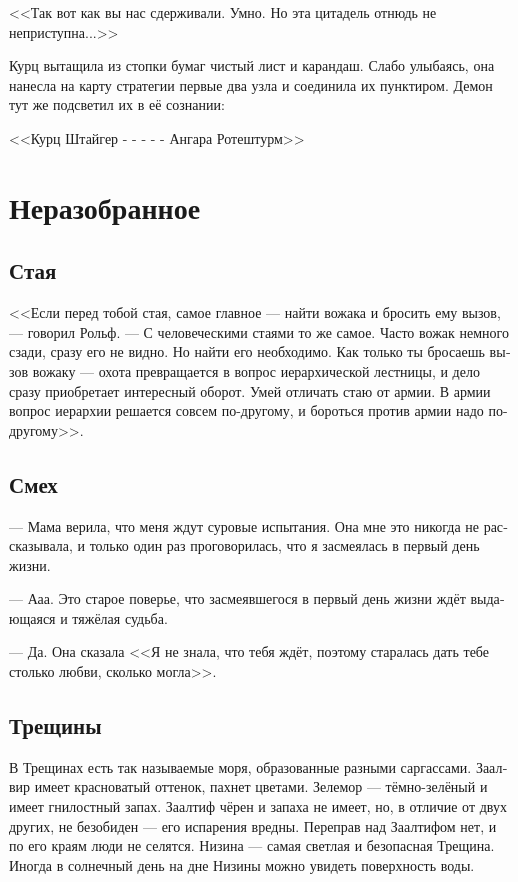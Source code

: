 \documentclass[a4paper,12pt,fleqn]{book}\usepackage{polyglossia}\setdefaultlanguage[babelshorthands=true]{russian}\setotherlanguage{english}\defaultfontfeatures{Ligatures=TeX,Mapping=tex-text}\usepackage{xcolor}\newcommand{\ml}[3]{#2}
\begin{document}
<<Так вот как вы нас сдерживали.
Умно.
Но эта цитадель отнюдь не неприступна...>>

Курц вытащила из стопки бумаг чистый лист и карандаш.
Слабо улыбаясь, она нанесла на карту стратегии первые два узла и соединила их пунктиром.
\ml{$0$}
{Демон тут же подсветил их в её сознании:}
{The daemon immediately highlighted them in her mind:}

\ml{$0$}
{<<Курц Штайгер - - - - - Ангара Ротештурм>>}
{\textit{Kurz Steiger - - - - - Angara Rotesturm}}

\chapter{Неразобранное}

\section{Стая}

<<Если перед тобой стая, самое главное --- найти вожака и бросить ему вызов, --- говорил Рольф.
--- С человеческими стаями то же самое.
Часто вожак немного сзади, сразу его не видно.
Но найти его необходимо.
Как только ты бросаешь вызов вожаку --- охота превращается в вопрос иерархической лестницы, и дело сразу приобретает интересный оборот.
Умей отличать стаю от армии.
В армии вопрос иерархии решается совсем по-другому, и бороться против армии надо по-другому>>. 

\section{Смех}

--- Мама верила, что меня ждут суровые испытания.
Она мне это никогда не рассказывала, и только один раз проговорилась, что я засмеялась в первый день жизни.

--- Ааа.
Это старое поверье, что засмеявшегося в первый день жизни ждёт выдающаяся и тяжёлая судьба.

--- Да.
Она сказала <<Я не знала, что тебя ждёт, поэтому старалась дать тебе столько любви, сколько могла>>.

\section{Трещины}

В Трещинах есть так называемые моря, образованные разными саргассами.
Заалвир имеет красноватый оттенок, пахнет цветами.
Зелемор --- тёмно-зелёный и имеет гнилостный запах.
Заалтиф чёрен и запаха не имеет, но, в отличие от двух других, не безобиден --- его испарения вредны.
Переправ над Заалтифом нет, и по его краям люди не селятся.
Низина --- самая светлая и безопасная Трещина.
Иногда в солнечный день на дне Низины можно увидеть поверхность воды.
\end{document}
